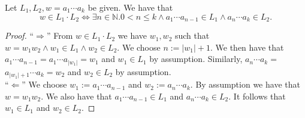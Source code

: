     \begin{lemma}
        \label{concP}
        Let $L_1, L_2, w = a_1 \cdots a_k$ be given. We have that
        \begin{equation*}
            w \in L_1 \cdot L_2  
            \iff
            \exists n \in \mathbb{N}. 0 < n \le k \wedge a_1 \cdots a_{n-1} \in L_1 \wedge a_n \cdots a_k \in L_2.
        \end{equation*}
    \end{lemma}
    \begin{proof}
        ``$\Rightarrow$'' 
        From $w \in L_1 \cdot L_2$ we have $w_1, w_2$ such that $w = w_1 w_2 \wedge w_1 \in L_1 \wedge w_2 \in L_2$.
        We choose $n := |w_1|+1$. We then have that $a_1 \cdots a_{n-1} = a_1 \cdots a_{|w_1|} = w_1$ and $w_1 \in L_1$ by assumption.
        Similarly, $a_{n} \cdots a_k = $$ a_{|w_1| + 1} \cdots a_k = w_2$ and $w_2 \in L_2$ by assumption.
        \\
        ``$\Leftarrow$'' 
        We choose $w_1 := a_1 \cdots a_{n-1}$ and $w_2 := a_n \cdots a_k$. By assumption we have that $w = w_1 w_2$.
        We also have that $a_1 \cdots a_{n-1} \in L_1$ and $a_{n} \cdots a_k \in L_2$. 
        It follows that $w_1 \in L_1$ and $w_2 \in L_2$.
    \end{proof}
    



